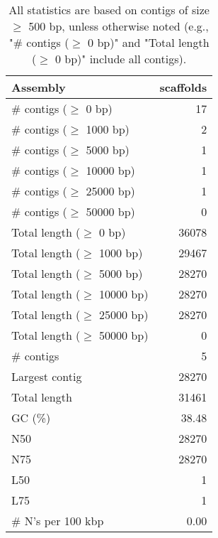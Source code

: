 \documentclass[12pt,a4paper]{article}
\begin{document}
\begin{table}[ht]
\begin{center}
\caption{All statistics are based on contigs of size $\geq$ 500 bp, unless otherwise noted (e.g., "\# contigs ($\geq$ 0 bp)" and "Total length ($\geq$ 0 bp)" include all contigs).}
\begin{tabular}{|l*{1}{|r}|}
\hline
Assembly & scaffolds \\ \hline
\# contigs ($\geq$ 0 bp) & 17 \\ \hline
\# contigs ($\geq$ 1000 bp) & 2 \\ \hline
\# contigs ($\geq$ 5000 bp) & 1 \\ \hline
\# contigs ($\geq$ 10000 bp) & 1 \\ \hline
\# contigs ($\geq$ 25000 bp) & 1 \\ \hline
\# contigs ($\geq$ 50000 bp) & 0 \\ \hline
Total length ($\geq$ 0 bp) & 36078 \\ \hline
Total length ($\geq$ 1000 bp) & 29467 \\ \hline
Total length ($\geq$ 5000 bp) & 28270 \\ \hline
Total length ($\geq$ 10000 bp) & 28270 \\ \hline
Total length ($\geq$ 25000 bp) & 28270 \\ \hline
Total length ($\geq$ 50000 bp) & 0 \\ \hline
\# contigs & 5 \\ \hline
Largest contig & 28270 \\ \hline
Total length & 31461 \\ \hline
GC (\%) & 38.48 \\ \hline
N50 & 28270 \\ \hline
N75 & 28270 \\ \hline
L50 & 1 \\ \hline
L75 & 1 \\ \hline
\# N's per 100 kbp & 0.00 \\ \hline
\end{tabular}
\end{center}
\end{table}
\end{document}
